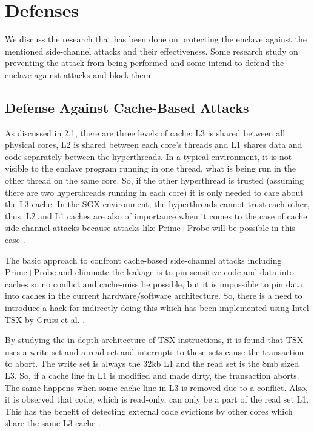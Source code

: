 \section{Defenses}
We discuss the research that has been done on protecting the enclave against the mentioned side-channel attacks and their effectiveness. Some research study on preventing the attack from being performed and some intend to defend the enclave against attacks and block them.

\subsection{Defense Against Cache-Based Attacks}
As discussed in 2.1, there are three levels of cache: L3 is shared between all physical cores, L2 is shared between each core's threads and L1 shares data and code separately between the hyperthreads. In a typical environment, it is not visible to the enclave program running in one thread, what is being run in the other thread on the same core. So, if the other hyperthread is trusted (assuming there are two hyperthreads running in each core) it is only needed to care about the L3 cache. In the SGX environment, the hyperthreads cannot trust each other, thus, L2 and L1 caches are also of importance when it comes to the case of cache side-channel attacks because attacks like Prime+Probe will be possible in this case \cite{cloak}.

The basic approach to confront cache-based side-channel attacks including Prime+Probe and eliminate the leakage is to pin sensitive code and data into caches so no conflict and cache-miss be possible, but it is impossible to pin data into caches in the current hardware/software architecture. So, there is a need to introduce a hack for indirectly doing this which has been implemented using Intel TSX by Gruss et al. \cite{cloak}.

By studying the in-depth architecture of TSX instructions, it is found that TSX uses a write set and a read set and interrupts to these sets cause the transaction to abort. The write set is always the 32kb L1 and the read set is the 8mb sized L3. So, if a cache line in L1 is modified and made dirty, the transaction aborts. The same happens when some cache line in L3 is removed due to a conflict. Also, it is observed that code, which is read-only, can only be a part of the read set L1. This has the benefit of detecting external code evictions by other cores which share the same L3 cache \cite{cloak}.

